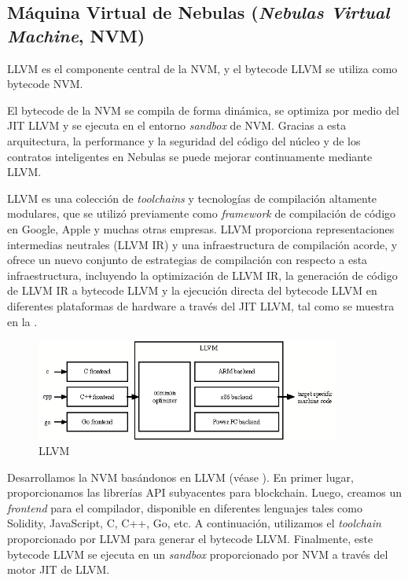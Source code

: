 \subsection{Máquina Virtual de Nebulas (\textit{Nebulas Virtual Machine}, NVM)}
\label{sec:nvm}

LLVM \cite{llvm} es el componente central de la NVM, y el bytecode LLVM se utiliza como bytecode NVM.

El bytecode de la NVM se compila de forma dinámica, se optimiza por medio del JIT LLVM y se ejecuta en el entorno \textit{sandbox} de NVM. Gracias a esta arquitectura, la performance y la seguridad del código del núcleo y de los contratos inteligentes en Nebulas se puede mejorar continuamente mediante LLVM.

LLVM es una colección de \textit{toolchains} y tecnologías de compilación altamente modulares, que se utilizó previamente como \textit{framework} de compilación de código en Google, Apple y muchas otras empresas. LLVM proporciona representaciones intermedias neutrales (LLVM IR) y una infraestructura de compilación acorde, y ofrece un nuevo conjunto de estrategias de compilación con respecto a esta infraestructura, incluyendo la optimización de LLVM IR, la generación de código de LLVM IR a bytecode LLVM y la ejecución directa del bytecode LLVM en diferentes plataformas de hardware a través del JIT LLVM, tal como se muestra en la . \\

\begin{figure}[h]
\centering
\includegraphics[width=10cm]{./figs/llvm}
\caption{LLVM}
\label{fig:llvm}
\end{figure}

Desarrollamos la NVM basándonos en LLVM (véase ). En primer lugar, proporcionamos las librerías API subyacentes para blockchain. Luego, creamos un \textit{frontend} para el compilador, disponible en diferentes lenguajes tales como Solidity, JavaScript, C, C++, Go, etc. A continuación, utilizamos el \textit{toolchain} proporcionado por LLVM para generar el bytecode LLVM. Finalmente, este bytecode LLVM se ejecuta en un \textit{sandbox} proporcionado por NVM a través del motor JIT de LLVM.

